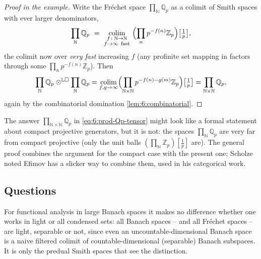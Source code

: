 \begin{proof}[Proof in the example]
Write the Fréchet space $\prod_{\mathbb{N}}\mathbb{Q}_p$ as a colimit of Smith
spaces with ever larger denominators,
\begin{equation*}
\prod_{\mathbb{N}}\mathbb{Q}_p\ =\
\operatorname*{colim}_{\substack{f\colon\mathbb{N}\to\mathbb{N}\\ f\to\infty\ \text{fast}}}\
\Bigl(\prod_{n}p^{-f(n)}\mathbb{Z}_p\Bigr)\bigl[\tfrac1p\bigr] ,
\end{equation*}
the colimit now over \emph{very fast} increasing $f$ (any profinite set mapping
in factors through some $\prod_n p^{-f(n)}\mathbb{Z}_p$). Then
\begin{equation*}
\prod_{\mathbb{N}}\mathbb{Q}_p\otimes^{\mathbb{L}\square}\prod_{\mathbb{N}}\mathbb{Q}_p
=\operatorname*{colim}_{f,g\to\infty}\Bigl(\prod_{\mathbb{N}\times\mathbb{N}}
p^{-f(n)-g(m)}\mathbb{Z}_p\Bigr)\bigl[\tfrac1p\bigr]
=\prod_{\mathbb{N}\times\mathbb{N}}\mathbb{Q}_p,
\end{equation*}
again by the combinatorial domination \cref{lem:6:combinatorial}.
\end{proof}

\begin{remark}
\label{rmk:6:huge-not-compact}
\ts{01:28:15}
The answer $\prod_{\mathbb{N}\times\mathbb{N}}\mathbb{Q}_p$ in
\eqref{eq:6:prod-Qp-tensor} might look like a formal statement about compact
projective generators, but it is not: the spaces $\prod_{\mathbb{N}}\mathbb{Q}_p$
are very far from compact projective (only the unit balls
$(\prod_{\mathbb{N}}\mathbb{Z}_p)[\tfrac1p]$ are). The general proof combines the
argument for the compact case with the present one; Scholze noted Efimov has a
slicker way to combine them, used in his categorical work.
\end{remark}

\subsection{Questions}

\begin{remark}
\label{rmk:6:light-banach}
\ts{01:34:42}
For functional analysis in large Banach spaces it makes no difference whether one
works in light or all condensed sets: all Banach spaces -- and all Fréchet
spaces -- are light, separable or not, since even an uncountable-dimensional
Banach space is a naive filtered colimit of countable-dimensional (separable)
Banach subspaces. It is only the predual Smith spaces that see the distinction.
\end{remark}

